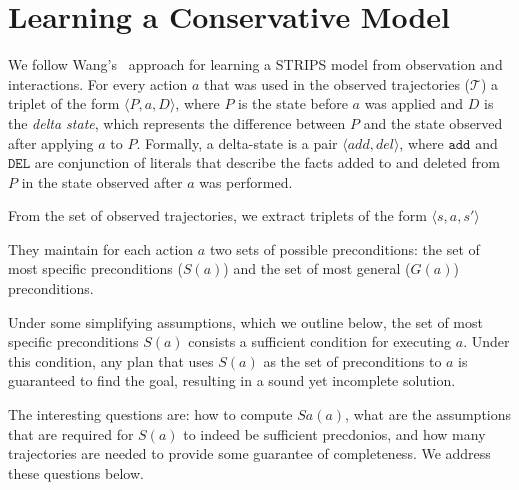 

\section{Learning a Conservative Model}
We follow Wang's~ approach for learning a STRIPS model from observation and interactions. For every action $a$ that was used in the observed trajectories ($\mathcal{T}$) a triplet of the form 
$\langle P, a, D\rangle$, where $P$ is the state before $a$ was applied and $D$ is the {\em delta state}, which represents the difference between $P$ and the state observed after applying $a$ to $P$. Formally, a delta-state is a pair $\langle add, del \rangle$, where $\mathtt{add}$ and $\mathtt{DEL}$ are conjunction of literals that describe the facts added to and deleted from $P$ in the state observed after $a$ was performed. %



From the set of observed trajectories, we extract triplets of the form $\langle s, a, s'\rangle$

They maintain for each action $a$ two sets of possible preconditions: the set of most specific preconditions ($S(a)$) and the set of most general ($G(a)$) preconditions. 

Under some simplifying assumptions, which we outline below, the set of most specific preconditions $S(a)$ consists a sufficient condition for executing $a$. Under this condition, any plan that uses $S(a)$ as the set of preconditions to $a$ is guaranteed to find the goal, resulting in a sound yet incomplete solution. 

The interesting questions are: how to compute $Sa(a)$, what are the assumptions that are required for $S(a)$ to indeed be sufficient precdonios, and how many trajectories are needed to provide some guarantee of completeness. We address these questions below. 




